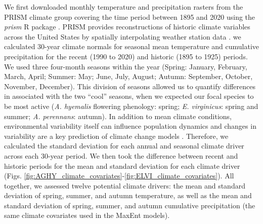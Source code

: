 \documentclass[11pt]{article}
\let\cite\citep
\newcommand{\secondrevise}[1]{{\color{black}{#1}}}
\begin{document}
We first downloaded monthly temperature and precipitation rasters from the PRISM climate group \citep{daly2013prism} covering the time period between 1895 and 2020 using the \emph{prism} R package \citep{Rprism2015}. 
PRISM provides reconstructions of historic climate variables across the United States by spatially interpolating weather station data \citep{diLuzio2008constructing}. 
\linelabel{R3C3-begin}\secondrevise{Because the magnitude of observed climate change differs across seasons, and because different growing seasons is a key feature of the biology of our focal host species,} we calculated 30-year climate normals for seasonal mean temperature and cumulative precipitation for the recent (1990 to 2020) and historic (1895 to 1925) periods.
We used three four-month seasons within the year (Spring: January, February, March, April; Summer: May; June, July, August; Autumn: September, October, November, December). 
This division of seasons allowed us to quantify differences in \secondrevise{the primary climate change drivers, temperature and precipitation,} associated with the two ``cool'' seasons, when we expected our focal species to be most active (\emph{A. hyemalis} flowering phenology: spring; \emph{E. virginicus}: spring and summer; \emph{A. perennans}: autumn). 
In addition to mean climate conditions, environmental variability itself can influence population dynamics \cite{tuljapurkar_population_1982} and changes in variability are a key prediction of climate change models \cite{stocker2013technical, ipcc_2021}. 
Therefore, we calculated the standard deviation for each annual and seasonal climate driver across each 30-year period.
We then took the difference between recent and historic periods for the mean and standard deviation for each climate driver (Figs. \ref{fig:AGHY_climate_covariates}-\ref{fig:ELVI_climate_covariates}).
All together, we assessed twelve potential climate drivers: the mean and standard deviation of spring, summer, and autumn temperature, as well as the mean and standard deviation of spring, summer, and autumn cumulative precipitation (the same climate covariates used in the MaxEnt models).
\end{document}
